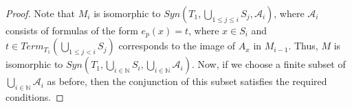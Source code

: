 \documentclass[reqno]{amsart}
\theoremstyle{definition}
\theoremstyle{remark}
\newcommand{\I}{\mathrm{I}}
\numberwithin{figure}{section}
\begin{document}
\begin{proof}
Note that $M_i$ is isomorphic to $Syn(T_1, \bigcup_{1 \leq j \leq i} S_j, \mathcal{A}_i)$,
where $\mathcal{A}_i$ consists of formulas of the form $e_p(x) = t$, where $x \in S_i$ and $t \in Term_{T_1}(\bigcup_{1 \leq j < i} S_j)$ corresponds to the image of $A_x$ in $M_{i-1}$.
Thus, $M$ is isomorphic to $Syn(T_1, \bigcup_{i \in \mathbb{N}} S_i, \bigcup_{i \in \mathbb{N}} \mathcal{A}_i)$.
Now, if we choose a finite subset of $\bigcup_{i \in \mathbb{N}} \mathcal{A}_i$ as before, then the conjunction of this subset satisfies the required conditions.
\end{proof}

\begin{comment}
This proposition implies that Morita equivalences can be characterized in terms of a lifting property.
Let $\I$ be the set of the following morphisms of theories:
For every predicate symbol $P : s_1 \times \ldots \times s_k$ and every function symbols $A : s_1 \times \ldots \times s_k \to (d_p,n)$ and $a : s_1 \times \ldots \times s_k \to (p,n)$,
let $i_{P,A,a}$ be the following morphism of theories:
\[ \{ P(x_1, \ldots x_k) \sststile{}{x_1, \ldots x_k} A(x_1, \ldots x_k)\!\downarrow \} \to \{ P(x_1, \ldots x_k) \sststile{}{x_1, \ldots x_k} a(x_1, \ldots x_k)\!\downarrow \}, \]
where $i_{P,A,a}(A) = e_p(a)$.
We can define a relative cylinder object for $i_{P,A,a}$ as
\[ \{ P(x_1, \ldots x_k) \sststile{}{x_1, \ldots x_k} e_p(h(x_1, \ldots x_k)) = I \times A(x_1, \ldots x_k) \}, \]
where $h : s_1 \times \ldots \times s_k \to (p,n+1)$.
Then the previous proposition immediately implies the following corollary:

\begin{cor}
A morphism of theories is a Morita equivalence if and only if it has RLP up to $\sim_i$ with respect to every $i \in \I$.
\end{cor}

If we want to prove that a morphism $f : T_1 \to T_2$ is a Morita equivalence, we can try to use the same idea as in the proof of \cite[Lemma~3.7]{alg-models}.
We define functions $g : Term_{T_2}(V)_{(p,n)} \to Term_{T_1}(V)_{(p,n)}$ and $h : Term_{T_2}(V)_{(p,n)} \to Term_{T_2}(V)_{(p,n+1)}$.
To show that $g(a)$ and $h(a)$ satisfy conditions of \rprop{str-morita-char}, we need to prove several properties of $g$ and $h$,
one of which is that they must preserve axioms of $T_2$.
The problem with this construction is that they might not preserve all axioms.
Often we have some axioms that express reduction rules.
If $g$ and $h$ do not preserve these axioms, then we can try to fix this problem by first applying a normalization function.
Such function usually does not preserve substitutions and thus does not define morphisms of theories.
We call such functions \emph{pseudomorphisms}:


\end{comment}
\end{document}
